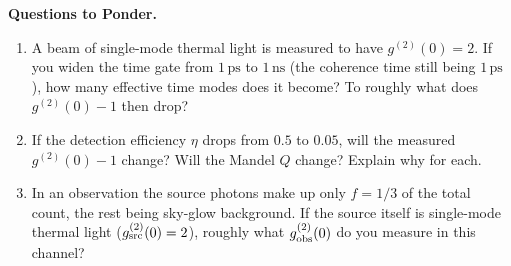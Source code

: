 \medskip
\noindent\textbf{Questions to Ponder.}
\begin{enumerate}
  \item A beam of single-mode thermal light is measured to have \(g^{(2)}(0)=2\). If you widen the time gate from \(1\,\mathrm{ps}\) to \(1\,\mathrm{ns}\) (the coherence time still being \(1\,\mathrm{ps}\)), how many effective time modes does it become? To roughly what does \(g^{(2)}(0)-1\) then drop?
  \item If the detection efficiency \(\eta\) drops from \(0.5\) to \(0.05\), will the measured \(g^{(2)}(0)-1\) change? Will the Mandel \(Q\) change? Explain why for each.
  \item In an observation the source photons make up only \(f=1/3\) of the total count, the rest being sky-glow background. If the source itself is single-mode thermal light (\(g^{(2)}_{\rm src}(0)=2\)), roughly what \(g^{(2)}_{\rm obs}(0)\) do you measure in this channel?
\end{enumerate}
